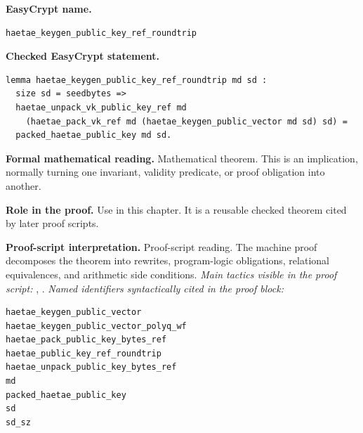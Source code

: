 \begin{formaltheorem}
\noindent\textbf{EasyCrypt name.}
\begin{lstlisting}[language=EasyCrypt,basicstyle=\ttfamily\scriptsize]
haetae_keygen_public_key_ref_roundtrip
\end{lstlisting}
\noindent\textbf{Checked EasyCrypt statement.}
\begin{lstlisting}[language=EasyCrypt,basicstyle=\ttfamily\scriptsize]
lemma haetae_keygen_public_key_ref_roundtrip md sd :
  size sd = seedbytes =>
  haetae_unpack_vk_public_key_ref md
    (haetae_pack_vk_ref md (haetae_keygen_public_vector md sd) sd) =
  packed_haetae_public_key md sd.
\end{lstlisting}
\noindent\textbf{Formal mathematical reading.}
Mathematical theorem. This is an implication, normally turning one invariant, validity predicate, or proof obligation into another.

\noindent\textbf{Role in the proof.}
Use in this chapter. It is a reusable checked theorem cited by later proof scripts.

\noindent\textbf{Proof-script interpretation.}
Proof-script reading. The machine proof decomposes the theorem into rewrites, program-logic obligations, relational equivalences, and arithmetic side conditions.
\emph{Main tactics visible in the proof script:} , .
\emph{Named identifiers syntactically cited in the proof block:}
\begin{lstlisting}[language=EasyCrypt,basicstyle=\ttfamily\scriptsize]
haetae_keygen_public_vector
haetae_keygen_public_vector_polyq_wf
haetae_pack_public_key_bytes_ref
haetae_public_key_ref_roundtrip
haetae_unpack_public_key_bytes_ref
md
packed_haetae_public_key
sd
sd_sz
\end{lstlisting}

\end{formaltheorem}

